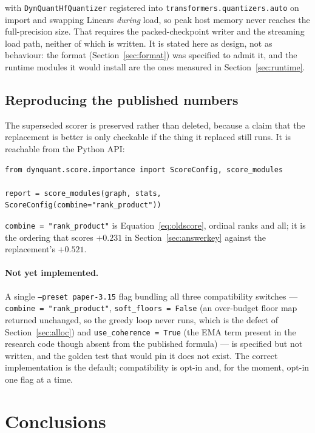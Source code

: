 \documentclass[11pt]{article}
\newcommand{\code}[1]{\texttt{#1}}
\begin{document}
with \code{DynQuantHfQuantizer} registered into \code{transformers.quantizers.auto} on import and
swapping Linears \emph{during} load, so peak host memory never reaches the full-precision size.
That requires the packed-checkpoint writer and the streaming load path, neither of which is
written. It is stated here as design, not as behaviour: the format
(Section~\ref{sec:format}) was specified to admit it, and the runtime modules it would install
are the ones measured in Section~\ref{sec:runtime}.

\subsection{Reproducing the published numbers}

The superseded scorer is preserved rather than deleted, because a claim that the replacement is
better is only checkable if the thing it replaced still runs. It is reachable from the Python
API:

\begin{verbatim}
from dynquant.score.importance import ScoreConfig, score_modules

report = score_modules(graph, stats, ScoreConfig(combine="rank_product"))
\end{verbatim}

\code{combine = "rank\_product"} is Equation~\ref{eq:oldscore}, ordinal ranks and all; it is the
ordering that scores $+0.231$ in Section~\ref{sec:answerkey} against the replacement's $+0.521$.

\paragraph{Not yet implemented.} A single \code{--preset paper-3.15} flag bundling all three
compatibility switches --- \code{combine = "rank\_product"}, \code{soft\_floors = False} (an
over-budget floor map returned unchanged, so the greedy loop never runs, which is the defect of
Section~\ref{sec:alloc}) and \code{use\_coherence = True} (the EMA term present in the research
code though absent from the published formula) --- is specified but not written, and the golden
test that would pin it does not exist. The correct implementation is the default; compatibility
is opt-in and, for the moment, opt-in one flag at a time.

\section{Conclusions}
\end{document}
